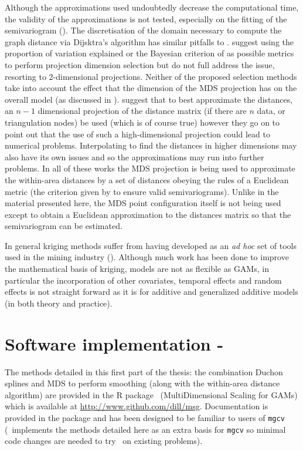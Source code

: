 Although the approximations used undoubtedly decrease the computational time, the validity of the approximations is not tested, especially on the fitting of the semivariogram (\cite{crabkrig}). The discretisation of the domain necessary to compute the graph distance via Dijsktra's algorithm has similar pitfalls to .  suggest using the proportion of variation explained or the Bayesian criterion of  as possible metrics to perform projection dimension selection but do not full address the issue, resorting to 2-dimensional projections. Neither of the proposed selection methods take into account the effect that the dimension of the MDS projection has on the overall model (as discussed in ).   suggest that to best approximate the distances, an $n-1$ dimensional projection of the distance matrix (if there are $n$ data, or triangulation nodes) be used (which is of course true) however they go on to point out that the use of such a high-dimensional projection could lead to numerical problems. Interpolating to find the distances in higher dimensions may also have its own issues and so the approximations may run into further problems. In all of these works the MDS projection is being used to approximate the within-area distances by a set of distances obeying the rules of a Euclidean metric (the criterion given by \cite{curriero} to ensure valid semivariograms). Unlike in the material presented here, the MDS point configuration itself is not being used except to obtain a Euclidean approximation to the distances matrix so that the semivariogram can be estimated.

In general kriging methods suffer from having developed as an \textit{ad hoc} set of tools used in the mining industry (\cite[preface]{diggle}). Although much work has been done to improve the mathematical basis of kriging, models are not as flexible as GAMs, in particular the incorporation of other covariates, temporal effects and random effects is not straight forward as it is for additive and generalized additive models (in both theory and practice).

\section{Software implementation - \mdspack}
\label{gds-software}

The methods detailed in this first part of the thesis: the combination Duchon splines and MDS to perform smoothing (along with the within-area distance algorithm) are provided in the \textsf{R} package \mdspack\ (MultiDimensional Scaling for GAMs) which is available at \url{http://www.github.com/dill/msg}. Documentation is provided in the package and has been designed to be familiar to users of \texttt{mgcv} (\mdspack\ implements the methods detailed here as an extra basis for \texttt{mgcv} so minimal code changes are needed to try \mdsds\ on existing problems).

